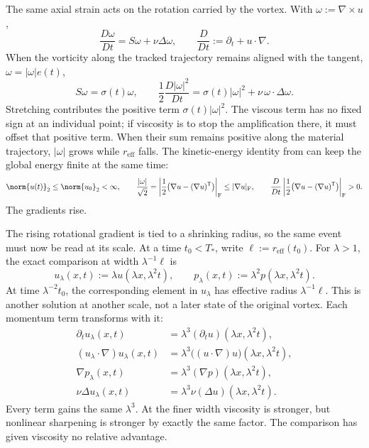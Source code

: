 The same axial strain acts on the rotation carried by the vortex.
With \(\omega:=\nabla\times u\),
\[
  \frac{D\omega}{Dt}
  =
  S\omega+\nu\Delta\omega,
  \qquad
  \frac{D}{Dt}
  :=
  \partial_t+u\cdot\nabla.
\]
When the vorticity along the tracked trajectory remains aligned with the tangent, \(\omega=|\omega|e(t)\),
\[
  S\omega
  =
  \sigma(t)\omega,
  \qquad
  \frac12\frac{D|\omega|^2}{Dt}
  =
  \sigma(t)|\omega|^2
  +
  \nu\,\omega\cdot\Delta\omega.
\]
Stretching contributes the positive term \(\sigma(t)|\omega|^2\).
The viscous term has no fixed sign at an individual point; if viscosity is to stop the amplification there, it must offset that positive term.
When their sum remains positive along the material trajectory, \(|\omega|\) grows while \(r_{\mathrm{eff}}\) falls.
The kinetic-energy identity from  can keep the global energy finite at the same time:
\[
  \norm{u(t)}_2
  \leq
  \norm{u_0}_2
  <
  \infty,
  \qquad
  \frac{|\omega|}{\sqrt2}
  =
  \left|\frac12\bigl(\nabla u-(\nabla u)^{\mathsf T}\bigr)\right|_{\mathrm F}
  \leq
  |\nabla u|_{\mathrm F},
  \qquad
  \frac{D}{Dt}
  \left|\frac12\bigl(\nabla u-(\nabla u)^{\mathsf T}\bigr)\right|_{\mathrm F}
  >
  0.
\]
The gradients rise.


The rising rotational gradient is tied to a shrinking radius, so the same event must now be read at its scale.
At a time \(t_0<T_*\), write \(\ell:=r_{\mathrm{eff}}(t_0)\).
For \(\lambda>1\), the exact \NavierStokes{} comparison at width \(\lambda^{-1}\ell\) is
\[
  u_\lambda(x,t)
  :=
  \lambda u(\lambda x,\lambda^2t),
  \qquad
  p_\lambda(x,t)
  :=
  \lambda^2p(\lambda x,\lambda^2t).
\]
At time \(\lambda^{-2}t_0\), the corresponding element in \(u_\lambda\) has effective radius \(\lambda^{-1}\ell\).
This is another solution at another scale, not a later state of the original vortex.
Each momentum term transforms with it:
\[
\begin{aligned}
  \partial_tu_\lambda(x,t)
  &=
  \lambda^3(\partial_tu)(\lambda x,\lambda^2t),
  \\
  (u_\lambda\cdot\nabla)u_\lambda(x,t)
  &=
  \lambda^3\bigl((u\cdot\nabla)u\bigr)(\lambda x,\lambda^2t),
  \\
  \nabla p_\lambda(x,t)
  &=
  \lambda^3(\nabla p)(\lambda x,\lambda^2t),
  \\
  \nu\Delta u_\lambda(x,t)
  &=
  \lambda^3\nu(\Delta u)(\lambda x,\lambda^2t).
\end{aligned}
\]
Every term gains the same \(\lambda^3\).
At the finer width viscosity is stronger, but nonlinear sharpening is stronger by exactly the same factor.
The comparison has given viscosity no relative advantage.

